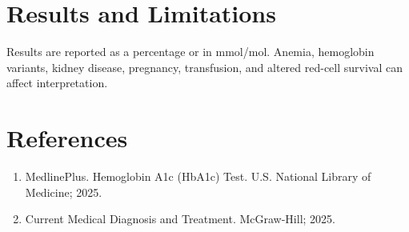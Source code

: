 \section*{Results and Limitations}
Results are reported as a percentage or in mmol/mol. Anemia, hemoglobin variants, kidney disease, pregnancy, transfusion, and altered red-cell survival can affect interpretation.

\section*{References}
\begin{enumerate}
  \item MedlinePlus. Hemoglobin A1c (HbA1c) Test. U.S. National Library of Medicine; 2025.
  \item Current Medical Diagnosis and Treatment. McGraw-Hill; 2025.
\end{enumerate}
\clearpage

